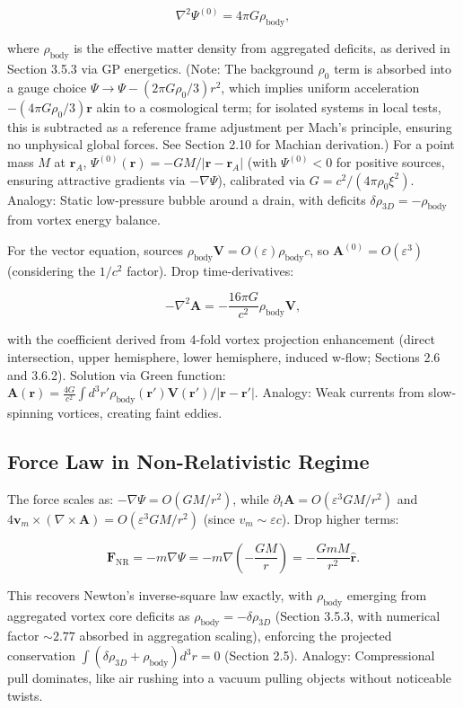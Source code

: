 \documentclass{article}
\begin{document}
\[
\nabla^2 \Psi^{(0)} = 4\pi G \rho_{\text{body}},
\]

where $\rho_{\text{body}}$ is the effective matter density from aggregated deficits, as derived in Section 3.5.3 via GP energetics. (Note: The background $\rho_0$ term is absorbed into a gauge choice $\Psi \to \Psi - (2\pi G \rho_0 / 3) r^2$, which implies uniform acceleration $- (4\pi G \rho_0 / 3) \mathbf{r}$ akin to a cosmological term; for isolated systems in local tests, this is subtracted as a reference frame adjustment per Mach's principle, ensuring no unphysical global forces. See Section 2.10 for Machian derivation.) For a point mass $M$ at $\mathbf{r}_A$, $\Psi^{(0)}(\mathbf{r}) = -GM / |\mathbf{r} - \mathbf{r}_A|$ (with $\Psi^{(0)} < 0$ for positive sources, ensuring attractive gradients via $-\nabla \Psi$), calibrated via $G = c^2 / (4\pi \rho_0 \xi^2)$. Analogy: Static low-pressure bubble around a drain, with deficits $\delta \rho_{3D} = -\rho_{\text{body}}$ from vortex energy balance.

For the vector equation, sources $\rho_{\text{body}} \mathbf{V} = O(\varepsilon) \rho_{\text{body}} c$, so $\mathbf{A}^{(0)} = O(\varepsilon^3)$ (considering the $1/c^2$ factor). Drop time-derivatives:

\[
- \nabla^2 \mathbf{A} = -\frac{16\pi G}{c^2} \rho_{\text{body}} \mathbf{V},
\]

with the coefficient derived from 4-fold vortex projection enhancement (direct intersection, upper hemisphere, lower hemisphere, induced w-flow; Sections 2.6 and 3.6.2). Solution via Green function: $\mathbf{A}(\mathbf{r}) = \frac{4 G}{c^2} \int d^3 r' \rho_{\text{body}}(\mathbf{r}') \mathbf{V}(\mathbf{r}') / |\mathbf{r} - \mathbf{r}'|$. Analogy: Weak currents from slow-spinning vortices, creating faint eddies.

\subsection{Force Law in Non-Relativistic Regime}

The force scales as: $-\nabla \Psi = O(GM/r^2)$, while $\partial_t \mathbf{A} = O(\varepsilon^3 GM/r^2)$ and $4 \mathbf{v}_m \times (\nabla \times \mathbf{A}) = O(\varepsilon^3 GM/r^2)$ (since $v_m \sim \varepsilon c$). Drop higher terms:

\[
\mathbf{F}_{\text{NR}} = -m \nabla \Psi = -m \nabla \left(-\frac{GM}{r}\right) = - \frac{G m M}{r^2} \hat{\mathbf{r}}.
\]

This recovers Newton's inverse-square law exactly, with $\rho_{\text{body}}$ emerging from aggregated vortex core deficits as $\rho_{\text{body}} = - \delta \rho_{3D}$ (Section 3.5.3, with numerical factor $\sim 2.77$ absorbed in aggregation scaling), enforcing the projected conservation $\int (\delta \rho_{3D} + \rho_{\text{body}}) d^3 r = 0$ (Section 2.5). Analogy: Compressional pull dominates, like air rushing into a vacuum pulling objects without noticeable twists.
\end{document}
